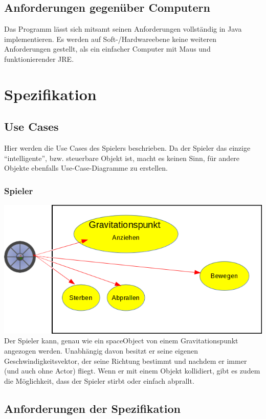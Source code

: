 \documentclass[12pt,a4paper]{scrartcl}
\newcommand{\q}[1]{``#1''}
\begin{document}
\subsection{Anforderungen gegenüber Computern}
Das Programm lässt sich mitsamt seinen Anforderungen vollständig in Java implementieren.
Es werden auf Soft-/Hardwareebene keine weiteren Anforderungen gestellt, als ein einfacher Computer mit
Maus und funktionierender JRE.


\section{Spezifikation}
\subsection{Use Cases}
Hier werden die Use Cases des Spielers beschrieben. Da der Spieler das einzige \q{intelligente}, bzw.
steuerbare Objekt ist, macht es keinen Sinn, für andere Objekte ebenfalls Use-Case-Diagramme zu erstellen.
\subsubsection{Spieler}
\includegraphics[scale=0.7]{use_cases/spieler.png}\\
Der Spieler kann, genau wie ein spaceObject von einem Gravitationspunkt angezogen werden. Unabhängig davon besitzt er seine eigenen Geschwindigkeitsvektor, der seine Richtung bestimmt und nachdem er immer (und auch ohne Actor) fliegt. Wenn er mit einem Objekt kollidiert, gibt es zudem die Möglichkeit, dass der Spieler
stirbt oder einfach abprallt.


\subsection{Anforderungen der Spezifikation} 
\end{document}
